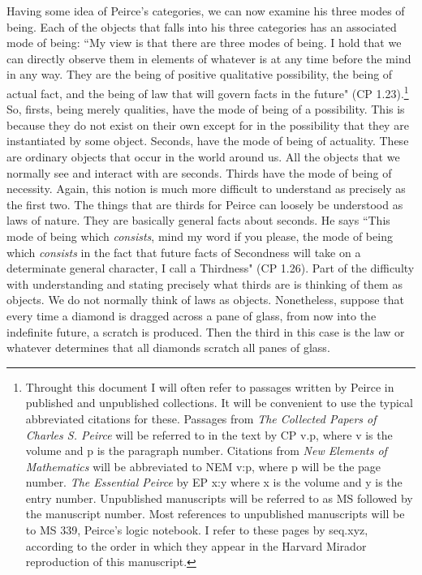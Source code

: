 \documentclass[12pt]{article}
\begin{document}
Having some idea of Peirce's categories, we can now examine his three modes of being. Each of the objects that falls into his three categories has an associated mode of being: ``My view is that there are three modes of being. I hold that we can directly observe them in elements of whatever is at any time before the mind in any way. They are the being of positive qualitative possibility, the being of actual fact, and the being of law that will govern facts in the future" (CP 1.23).\footnote{Throught this document I will often refer to passages written by Peirce in published and unpublished collections. It will be convenient to use the typical abbreviated citations for these. Passages from \textit{The Collected Papers of Charles S. Peirce} will be referred to in the text by CP v.p, where v is the volume and p is the paragraph number. Citations from \textit{New Elements of Mathematics} will be abbreviated to NEM v:p, where p will be the page number. \textit{The Essential Peirce} by EP x:y where x is the volume and y is the entry number. Unpublished manuscripts will be referred to as MS followed by the manuscript number. Most references to unpublished manuscripts will be to MS 339, Peirce's logic notebook. I refer to these pages by seq.xyz, according to the order in which they appear in the Harvard Mirador reproduction of this manuscript.} So, firsts, being merely qualities, have the mode of being of a possibility. This is because they do not exist on their own except for in the possibility that they are instantiated by some object. Seconds, have the mode of being of actuality. These are ordinary objects that occur in the world around us. All the objects that we normally see and interact with are seconds. Thirds have the mode of being of necessity. Again, this notion is much more difficult to understand as precisely as the first two. The things that are thirds for Peirce can loosely be understood as laws of nature. They are basically general facts about seconds. He says ``This mode of being which \textit{consists}, mind my word if you please, the mode of being which \textit{consists} in the fact that future facts of Secondness will take on a determinate general character, I call a Thirdness" (CP 1.26). Part of the difficulty with understanding and stating precisely what thirds are is thinking of them as objects. We do not normally think of laws as objects. Nonetheless, suppose that every time a diamond is dragged across a pane of glass, from now into the indefinite future, a scratch is produced. Then the third in this case is the law or whatever determines that all diamonds scratch all panes of glass.
\end{document}
